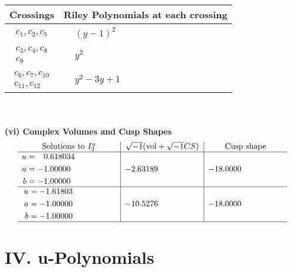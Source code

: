 \documentclass[1p]{elsarticle_modified}
\theoremstyle{definition}
\newcommand{\I}{\sqrt{-1}}
\begin{document}
\begin{tabular}{m{50pt}|m{274pt}}
Crossings & \hspace{64pt}Riley Polynomials at each crossing \\
\hline $$\begin{aligned}c_{1},c_{2},c_{5}\end{aligned}$$&$\begin{aligned}
&(y-1)^2
\end{aligned}$\\
\hline $$\begin{aligned}c_{3},c_{4},c_{8}\\c_{9}\end{aligned}$$&$\begin{aligned}
&y^2
\end{aligned}$\\
\hline $$\begin{aligned}c_{6},c_{7},c_{10}\\c_{11},c_{12}\end{aligned}$$&$\begin{aligned}
&y^2-3 y+1
\end{aligned}$\\
\hline
\end{tabular}\\~\\
\newpage\flushleft \textbf{(vi) Complex Volumes and Cusp Shapes}
$$\begin{array}{c|c|c}  
\text{Solutions to }I^u_{3}& \I (\text{vol} + \sqrt{-1}CS) & \text{Cusp shape}\\
 \hline 
\begin{aligned}
u &= \phantom{-}0.618034\phantom{ +0.000000I} \\
a &= -1.00000\phantom{ +0.000000I} \\
b &= -1.00000\phantom{ +0.000000I}\end{aligned}
 & -2.63189\phantom{ +0.000000I} & -18.0000\phantom{ +0.000000I} \\ \hline\begin{aligned}
u &= -1.61803\phantom{ +0.000000I} \\
a &= -1.00000\phantom{ +0.000000I} \\
b &= -1.00000\phantom{ +0.000000I}\end{aligned}
 & -10.5276\phantom{ +0.000000I} & -18.0000\phantom{ +0.000000I}\\
 \hline 
 \end{array}$$\newpage
\newpage\renewcommand{\arraystretch}{1}
\centering \section*{ IV. u-Polynomials}
\end{document}
